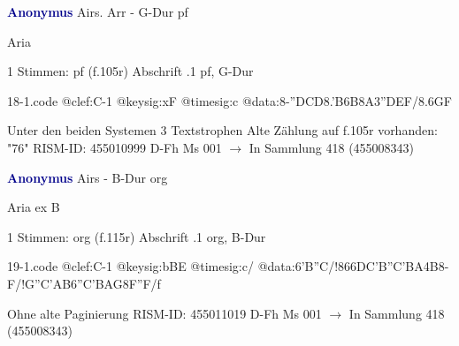 \documentclass[twocolumn]{book}
\begin{document}
\newline \par \vspace{7pt} \textcolor{darkblue}{\textbf{Anonymus  }}
\newline Airs. Arr - G-Dur
\newline pf
\newline \begin{itshape} Aria\end{itshape} 
\newline \textcolor{darkblue}{}  1 Stimmen: pf  (f.105r)
\newline Abschrift
.1  pf, G-Dur  
\begin{filecontents*}{18-1.code}
@clef:C-1
@keysig:xF
@timesig:c
@data:8-''D{CD}{8.'B6B}8A{3''DEF}/{8.6GF}
\end{filecontents*}
\newline
%
\newline Unter den beiden Systemen 3 Textstrophen
\newline Alte Zählung auf f.105r vorhanden: "76"
\newline RISM-ID: 455010999
\newline D-Fh  Ms 001
\newline $\rightarrow$ In Sammlung 418 (455008343)
      
\newline \par \vspace{7pt} \textcolor{darkblue}{\textbf{Anonymus  }}
\newline Airs - B-Dur
\newline org
\newline \begin{itshape}[f.115r, heading:] Aria ex B\end{itshape} 
\newline \textcolor{darkblue}{}  1 Stimmen: org  (f.115r)
\newline Abschrift
.1  org, B-Dur  
\begin{filecontents*}{19-1.code}
@clef:C-1
@keysig:bBE
@timesig:c/
@data:{6'B''C}/!{866DC'B}{''C'BA}4B8-F/!{G''C}{'AB}{6''C'BAG}{8F''F}/f
\end{filecontents*}
\newline
%
\newline Ohne alte Paginierung
\newline RISM-ID: 455011019
\newline D-Fh  Ms 001
\newline $\rightarrow$ In Sammlung 418 (455008343)
      
\end{document}

